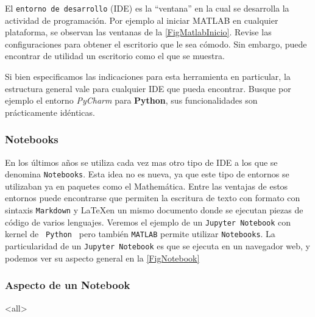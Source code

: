 {
  El \texttt{entorno de desarrollo} (IDE) es la ``ventana''  en la cual se desarrolla la actividad de programación.
 Por ejemplo al iniciar MATLAB en cualquier plataforma, se observan las ventanas de la 
 \autoref{FigMatlabInicio}. Revise las configuraciones para obtener
el escritorio que le sea cómodo. Sin embargo, puede encontrar de 
 utilidad un escritorio como el que se muestra. 

 Si bien especificamos las indicaciones para esta herramienta 
 en particular, la estructura general vale para cualquier IDE que pueda encontrar.
 Busque por ejemplo el entorno \emph{PyCharm} para  \textbf{Python}, sus funcionalidades son   prácticamente idénticas.
}


\subsubsection{Notebooks}

En los últimos años se utiliza cada vez mas otro tipo de IDE a los que se denomina \texttt{Notebooks}.
Esta idea no es nueva, ya que este tipo de entornos se utilizaban ya en paquetes como el Mathemática.
Entre las ventajas de estos entornos puede encontrarse que permiten la escritura de texto con formato con sintaxis \texttt{Markdown} y \LaTeX \quad en un mismo documento donde se ejecutan piezas de código de varios lenguajes. 
Veremos el ejemplo de un \texttt{Jupyter Notebook} con kernel de \texttt{ Python } pero también \texttt{MATLAB} permite utilizar \texttt{Notebooks}. 
La particularidad de un \texttt{Jupyter Notebook} es que se ejecuta en un navegador web, y podemos ver su aspecto general en la \autoref{FigNotebook}

\mode*

\begin{frame}[label=FrameVentanaNotebook]
\frametitle<presentation>{Aspecto de un Notebook}
\begin{figure}
\begin{center}
\end{center}
\end{figure}
 
\end{frame}
\mode<all>
